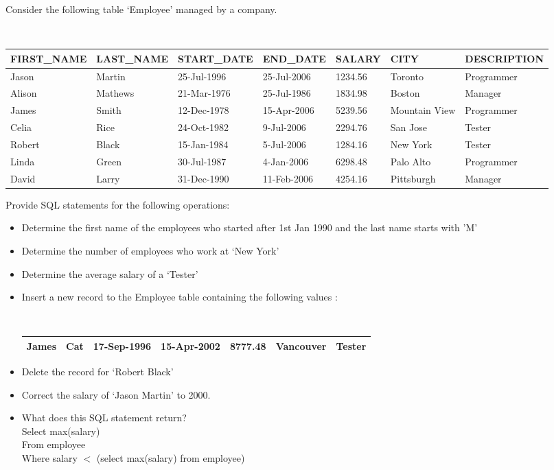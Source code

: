 \documentclass[12pt]{article}
\begin{document}
Consider the following table ‘Employee’ managed by a company.
\begin {table}[h]
\begin{center}
  \footnotesize\tt
\begin{tabular}{|l|l|l|l|l|l|l|}
  \hline
  FIRST\_NAME & LAST\_NAME & START\_DATE & END\_DATE & SALARY & CITY& DESCRIPTION\\
  \hline
  Jason & Martin & 25-Jul-1996 & 25-Jul-2006& 1234.56& Toronto& Programmer\\
  \hline
  Alison & Mathews & 21-Mar-1976 &  25-Jul-1986 & 1834.98& Boston& Manager\\
  \hline
  James &Smith & 12-Dec-1978 & 15-Apr-2006& 5239.56& Mountain View& Programmer\\
  \hline
  Celia & Rice & 24-Oct-1982 & 9-Jul-2006& 2294.76& San Jose& Tester\\
  \hline
  Robert & Black & 15-Jan-1984 & 5-Jul-2006& 1284.16& New York& Tester\\
  \hline
  Linda & Green & 30-Jul-1987& 4-Jan-2006& 6298.48& Palo Alto& Programmer\\
  \hline
  David & Larry & 31-Dec-1990& 11-Feb-2006& 4254.16& Pittsburgh& Manager\\\hline
\end{tabular}
\end{center}
\end{table}
Provide SQL statements for the following operations:
\begin{itemize}
\item
Determine the first name of the employees who started after 1st Jan 1990 and the last
name starts with 'M'
\item
Determine the number of employees who work at ‘New York’
\item
Determine the average salary of a ‘Tester’
\item
Insert a new record to the Employee table containing the following values :\\
\begin{table}[h]
\begin{center}
  \footnotesize\tt
\begin{tabular}{|l|l|l|l|l|l|l|}
  \hline
  James & Cat & 17-Sep-1996& 15-Apr-2002& 8777.48& Vancouver& Tester\\
  \hline
\end{tabular}
\end{center}
\end{table}
\item
Delete the record for ‘Robert Black’
\item
Correct the salary of ‘Jason Martin’ to 2000.
\item
What does this SQL statement return?\\
Select max(salary)\\
From employee\\
Where salary $<$ (select max(salary) from employee)
\end{itemize}
\end{document}
